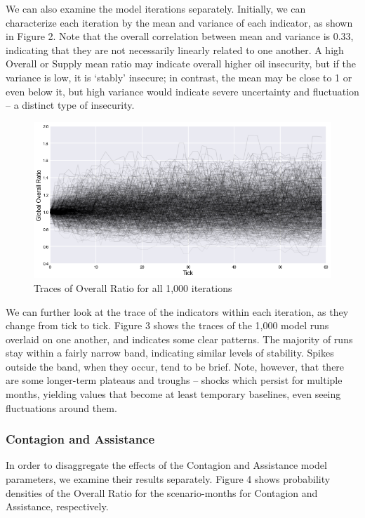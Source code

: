 \documentclass{article}
\begin{document}
We can also examine the model iterations separately. Initially, we can characterize each iteration by the mean and variance of each indicator, as shown in Figure 2. Note that the overall correlation between mean and variance is 0.33, indicating that they are not necessarily linearly related to one another. A high Overall or Supply mean ratio may indicate overall higher oil insecurity, but if the variance is low, it is `stably' insecure; in contrast, the mean may be close to 1 or even below it, but high variance would indicate severe uncertainty and fluctuation -- a distinct type of insecurity. 

\begin{figure}[h!]
	\centering
	\includegraphics[width=\textwidth]{../Graphics/AllOverallTraces}
	\caption{Traces of Overall Ratio for all 1,000 iterations}
\end{figure}


We can further look at the trace of the indicators within each iteration, as they change from tick to tick. Figure 3 shows the traces of the 1,000 model runs overlaid on one another, and indicates some clear patterns. The majority of runs stay within a fairly narrow band, indicating similar levels of stability. Spikes outside the band, when they occur, tend to be brief. Note, however, that there are some longer-term plateaus and troughs -- shocks which persist for multiple months, yielding values that become at least temporary baselines, even seeing fluctuations around them.

\subsubsection{Contagion and Assistance}

In order to disaggregate the effects of the Contagion and Assistance model parameters, we examine their results separately. Figure 4 shows probability densities of the Overall Ratio for the scenario-months for Contagion and Assistance, respectively.
\end{document}
